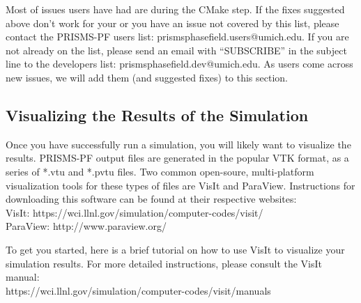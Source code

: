 \documentclass[10pt]{article} %
\begin{document}
Most of issues users have had are during the CMake step. If the fixes suggested above don't work for your or you have an issue not covered by this list, please contact the PRISMS-PF users list: prismsphasefield.users@umich.edu. If you are not already on the list, please send an email with ``SUBSCRIBE'' in the subject line to the developers list: prismsphasefield.dev@umich.edu. As users come across new issues, we will add them (and suggested fixes) to this section.

\subsection{Visualizing the Results of the Simulation}
Once you have successfully run a simulation, you will likely want to visualize the results.  PRISMS-PF output files are generated in the popular VTK format, as a series of *.vtu and *.pvtu files. Two common open-soure, multi-platform visualization tools for these types of files are VisIt and ParaView. Instructions for downloading this software can be found at their respective websites:
\\VisIt: https://wci.llnl.gov/simulation/computer-codes/visit/
\\ParaView: http://www.paraview.org/

To get you started, here is a brief tutorial on how to use VisIt to visualize your simulation results. For more detailed instructions, please consult the VisIt manual:
\\ https://wci.llnl.gov/simulation/computer-codes/visit/manuals
\end{document}
